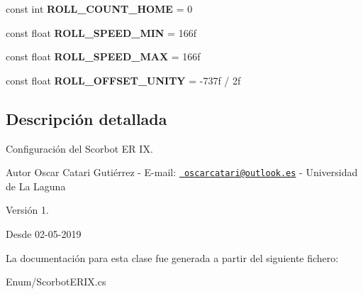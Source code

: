\begin{DoxyCompactItemize}
const int {\bfseries R\+O\+L\+L\+\_\+\+C\+O\+U\+N\+T\+\_\+\+H\+O\+ME} = 0
\item 
\mbox{\label{class_scorbot_e_r_i_x_a1c5595b243018690f9e9208e8c850ba3}} 
const float {\bfseries R\+O\+L\+L\+\_\+\+S\+P\+E\+E\+D\+\_\+\+M\+IN} = 166f
\item 
\mbox{\label{class_scorbot_e_r_i_x_a0b7d9288b3dbb63dc616b588403e2e96}} 
const float {\bfseries R\+O\+L\+L\+\_\+\+S\+P\+E\+E\+D\+\_\+\+M\+AX} = 166f
\item 
\mbox{\label{class_scorbot_e_r_i_x_a40be825d898722ec0a358e688147988c}} 
const float {\bfseries R\+O\+L\+L\+\_\+\+O\+F\+F\+S\+E\+T\+\_\+\+U\+N\+I\+TY} = -\/737f / 2f
\end{DoxyCompactItemize}


\subsection{Descripción detallada}
Configuración del Scorbot ER IX. \begin{DoxyAuthor}{Autor}
Oscar Catari Gutiérrez -\/ E-\/mail\+: \href{mailto:oscarcatari@outlook.es}{\texttt{ oscarcatari@outlook.\+es}} -\/ Universidad de La Laguna 
\end{DoxyAuthor}
\begin{DoxyVersion}{Versión}
1. 
\end{DoxyVersion}
\begin{DoxySince}{Desde}
02-\/05-\/2019 
\end{DoxySince}


La documentación para esta clase fue generada a partir del siguiente fichero\+:\begin{DoxyCompactItemize}
\item 
Enum/Scorbot\+E\+R\+I\+X.\+cs\end{DoxyCompactItemize}
